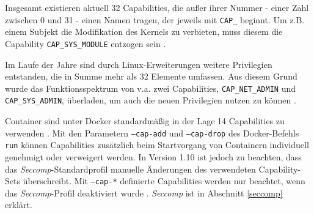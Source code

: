 \documentclass[../main.tex]{subfiles}
\begin{document}
			Insgesamt existieren aktuell 32 Capabilities, die außer ihrer Nummer - einer Zahl zwischen 0 und 31 - einen Namen tragen, der jeweils mit \texttt{CAP\_} beginnt. Um z.B. einem Subjekt die Modifikation des Kernels zu verbieten, muss diesem die Capability \texttt{CAP\_SYS\_MODULE} entzogen sein \cite[S.42]{SELinuxApparmor}.

			Im Laufe der Jahre sind durch Linux-Erweiterungen weitere Privilegien entstanden, die in Summe mehr als 32 Elemente umfassen. Aus diesem Grund wurde das Funktionsspektrum von v.a. zwei Capabilities, \texttt{CAP\_NET\_ADMIN} und \texttt{CAP\_SYS\_ADMIN}, überladen, um auch die neuen Privilegien nutzen zu können \cite[S.40f.]{SELinuxApparmor}.

			Container sind unter Docker standardmäßig in der Lage 14 Capabilities zu verwenden \cite{githubCapabilities}. Mit den Parametern \texttt{--cap-add} und \texttt{--cap-drop} des Docker-Befehls \texttt{run} können Capabilities zusätzlich beim Startvorgang von Containern individuell genehmigt oder verweigert werden. In Version 1.10 ist jedoch zu beachten, dass das \emph{Seccomp}-Standardprofil manuelle Änderungen des verwendeten Capability-Sets überschreibt. Mit \texttt{--cap-*} definierte Capabilities werden nur beachtet, wenn das \emph{Seccomp}-Profil deaktiviert wurde \cite{dockerRun}. \emph{Seccomp} ist in Abschnitt \ref{seccomp} erklärt.




\end{document}
